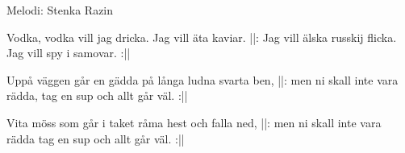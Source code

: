 \begin{song}

\begin{songmeta}
Melodi: Stenka Razin
\end{songmeta}

\begin{songtext}
Vodka, vodka vill jag dricka.
Jag vill äta kaviar.
||: Jag vill älska russkij flicka.
Jag vill spy i samovar. :||

Uppå väggen går en gädda
på långa ludna svarta ben,
||: men ni skall inte vara rädda,
tag en sup och allt går väl. :||

Vita möss som går i taket
råma hest och falla ned,
||: men ni skall inte vara rädda
tag en sup och allt går väl. :||
\end{songtext}
\end{song}
